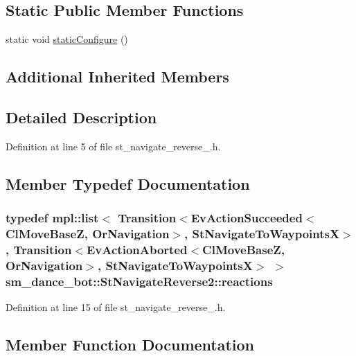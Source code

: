 \subsection*{Static Public Member Functions}
\begin{DoxyCompactItemize}
\item 
static void \hyperlink{structsm__dance__bot_1_1StNavigateReverse2_ae4809f28ccc5378f7a8f3c829d29d925}{static\+Configure} ()
\end{DoxyCompactItemize}
\subsection*{Additional Inherited Members}


\subsection{Detailed Description}


Definition at line 5 of file st\+\_\+navigate\+\_\+reverse\+\_.\+h.



\subsection{Member Typedef Documentation}
\subsubsection[{\texorpdfstring{reactions}{reactions}}]{\setlength{\rightskip}{0pt plus 5cm}typedef mpl\+::list$<$ Transition$<$Ev\+Action\+Succeeded$<${\bf Cl\+Move\+BaseZ}, {\bf Or\+Navigation}$>$, {\bf St\+Navigate\+To\+WaypointsX}$>$, Transition$<$Ev\+Action\+Aborted$<${\bf Cl\+Move\+BaseZ}, {\bf Or\+Navigation}$>$, {\bf St\+Navigate\+To\+WaypointsX}$>$ $>$ {\bf sm\+\_\+dance\+\_\+bot\+::\+St\+Navigate\+Reverse2\+::reactions}}\hypertarget{structsm__dance__bot_1_1StNavigateReverse2_a629dbeb24a7b120d7dfebeb4b9630d64}{}\label{structsm__dance__bot_1_1StNavigateReverse2_a629dbeb24a7b120d7dfebeb4b9630d64}


Definition at line 15 of file st\+\_\+navigate\+\_\+reverse\+\_.\+h.



\subsection{Member Function Documentation}
